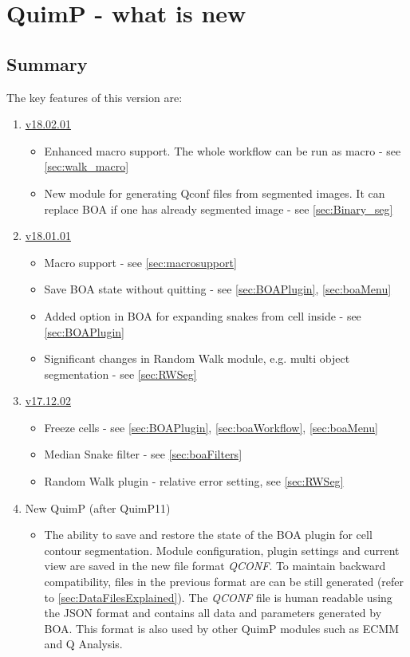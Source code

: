 \documentclass[a4paper,12pt]{article}
\begin{document}
\section{QuimP - what is new}

\subsection{Summary}
The key features of this version are:
\begin{enumerate}
	\item \href{http://pilip.lnx.warwick.ac.uk/site/changes-report.html#a18.02.01}{v18.02.01}
	\begin{itemize}
		\item Enhanced macro support. The whole workflow can be run as macro - see \autoref{sec:walk_macro}
		\item New module for generating Qconf files from segmented images. It can replace BOA if one has already segmented image - see \autoref{sec:Binary_seg} 
	\end{itemize}
	\item \href{http://pilip.lnx.warwick.ac.uk/site/changes-report.html#a18.01.01}{v18.01.01}
	\begin{itemize}
		\item Macro support - see \autoref{sec:macrosupport}
		\item Save BOA state without quitting - see \autoref{sec:BOAPlugin}, \autoref{sec:boaMenu}
		\item Added option in BOA for expanding snakes from cell inside - see \autoref{sec:BOAPlugin}
		\item Significant changes in Random Walk module, e.g. multi object segmentation - see \autoref{sec:RWSeg} 
	\end{itemize}
	\item \href{http://pilip.lnx.warwick.ac.uk/site/changes-report.html#a17.12.02}{v17.12.02}
	\begin{itemize}
		\item Freeze cells - see \autoref{sec:BOAPlugin}, \autoref{sec:boaWorkflow}, \autoref{sec:boaMenu}
		\item Median Snake filter - see \autoref{sec:boaFilters}
		\item Random Walk plugin - relative error setting, see \autoref{sec:RWSeg} 
	\end{itemize}
	\item New QuimP (after QuimP11)
	\begin{itemize}
		\item The ability to save and restore the state of the BOA plugin for cell contour segmentation. Module configuration, plugin settings and current view are saved in the new file format \textit{QCONF}. To maintain backward compatibility, files in the previous format are can be still generated (refer to \autoref{sec:DataFilesExplained}). The \textit{QCONF} file is human readable using the JSON format and contains all data and parameters generated by BOA. This format is also used by other QuimP modules such as ECMM and Q Analysis. 

\end{itemize}
\end{enumerate}
\end{document}

